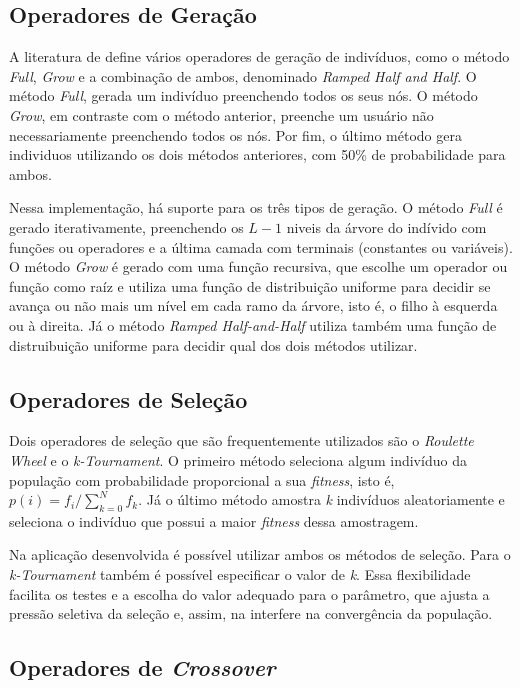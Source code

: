 \documentclass[a4paper]{paper}
\begin{document}
\subsection{Operadores de Geração} \label{subsec:generation}

A literatura de define vários operadores de geração de indivíduos, como o método
\textit{Full}, \textit{Grow} e a combinação de ambos, denominado \textit{Ramped
  Half and Half}. O método \textit{Full}, gerada um indivíduo preenchendo todos os
seus nós. O método \textit{Grow}, em contraste com o método anterior, preenche
um usuário não necessariamente preenchendo todos os nós. Por fim, o último método
gera individuos utilizando os dois métodos anteriores, com 50\% de probabilidade
para ambos.

Nessa implementação, há suporte para os três tipos de geração. O método
\textit{Full} é gerado iterativamente, preenchendo os $L-1$ niveis da árvore do
indívido com funções ou operadores e a última camada com terminais (constantes
ou variáveis).  O método \textit{Grow} é gerado com uma função recursiva, que
escolhe um operador ou função como raíz e utiliza uma função de distribuição
uniforme para decidir se avança ou não mais um nível em cada ramo da árvore,
isto é, o filho à esquerda ou à direita. Já o método \textit{Ramped
  Half-and-Half} utiliza também uma função de distruibuição uniforme para
decidir qual dos dois métodos utilizar.

\subsection{Operadores de Seleção} \label{subsec:selection}

Dois operadores de seleção que são frequentemente utilizados são o
\textit{Roulette Wheel} e o \textit{k-Tournament}. O primeiro método seleciona
algum indivíduo da população com probabilidade proporcional a sua
\textit{fitness}, isto é, $p(i)=f_i/\sum_{k=0}^{N}f_k$. Já o último método
amostra \textit{k} indivíduos aleatoriamente e seleciona o indivíduo que possui
a maior \textit{fitness} dessa amostragem.

Na aplicação desenvolvida é possível utilizar ambos os métodos de seleção. Para
o \textit{k-Tournament} também é possível especificar o valor de \textit{k}.
Essa flexibilidade facilita os testes e a escolha do valor adequado para o
parâmetro, que ajusta a pressão seletiva da seleção e, assim, na interfere na
convergência da população.

\subsection{Operadores de \textit{Crossover}} \label{subsec:crossover}
\end{document}
